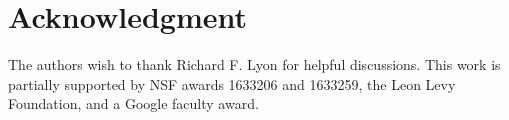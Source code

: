 \documentclass[journal]{IEEEtran}
\theoremstyle{remark}
\begin{document}
\section*{Acknowledgment}
The authors wish to thank Richard F. Lyon for helpful discussions.
This work is partially supported by NSF awards 1633206 and 1633259, the
Leon Levy Foundation, and a Google faculty award.








%



% 
\end{document}
